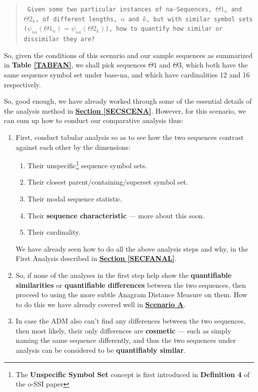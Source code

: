 \documentclass[a4paper, 18pt]{book} %
\begin{document}
\begin{quote}
\small
\texttt{
Given some two particular instances of na-Sequences, $\Theta1_n$ and $\Theta2_k$, of different lengths, $n$ and $k$, but with similar symbol sets ($\psi_{na}(\Theta1_n) = \psi_{na}(\Theta2_k)$), how to quantify how similar or dissimilar they are?}
\end{quote}

So, given the conditions of this scenario and our sample sequences as summarized in \textbf{Table \ref{TABFAN}}, we shall pick sequences $\Theta1$ and $\Theta3$, which both have the same sequence symbol set under base-na, and which have cardinalities 12 and 16 respectively.

So, good enough, we have already worked through some of the essential details of the analysis method in \textbf{\hyperref[SECSCENA]{Section \ref{SECSCENA}}}. However, for this scenario, we can sum up how to conduct our comparative analysis thus:

\begin{enumerate}
\item{First, conduct tabular analysis so as to see how the two sequences contrast against each other by the dimensions: 
\begin{enumerate}
\item Their unspecific\footnote{The \textbf{Unspecific Symbol Set} concept is first introduced in \textbf{Definition 4} of the o-SSI paper\cite{ossipaper}} sequence symbol sets.
\item Their closest parent/containing/superset symbol set.
\item Their modal sequence statistic.
\item Their \textbf{sequence characteristic} --- more about this soon.
\item Their cardinality.
\end{enumerate}

We have already seen how to do all the above analysis steps and why, in the First Analysis described in \textbf{\hyperref[SECFANAL]{Section \ref{SECFANAL}}}.
}
\item So, if none of the analyses in the first step help show the \textbf{quantifiable similarities} or \textbf{quantifiable differences} between the two sequences, then proceed to using the more subtle Anagram Distance Measure on them. How to do this we have already covered well in \textbf{\hyperref[SECSCENA]{Scenario A}}.
\item In case the ADM also can't find any differences between the two sequences, then most likely, their only differences are \textbf{cosmetic} --- such as simply naming the same sequence differently, and thus the two sequences under analysis can be considered to be \textbf{quantifiably similar}.
\end{enumerate}
\end{document}
